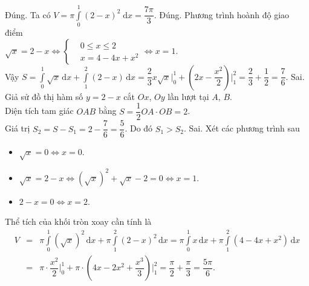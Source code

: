 \begin{ex}
{\begin{itemchoice}
	\itemch Đúng. Ta có $V=\pi\displaystyle\int\limits_0^1(2-x)^2\mathrm{\;d}x=\dfrac{7\pi}{3}$.
	\itemch Đúng. 	Phương trình hoành độ giao điểm \\$\sqrt{x}=2-x \Leftrightarrow \left\{\begin{aligned}
		&0\leqslant x\leqslant 2 \\
		&x=4-4x+x^2
	\end{aligned}\right. \Leftrightarrow x=1$. \\
	Vậy $S=\displaystyle\int\limits_0^1 \sqrt{x} \mathrm{\,d}x+\displaystyle\int\limits_1^2 (2-x) \mathrm{\,d}x=\dfrac{2}{3}x\sqrt{x}\bigg|_0^1+\left(2x-\dfrac{x^2}{2}\right)\bigg|_1^2=\dfrac{2}{3}+\dfrac{1}{2}=\dfrac{7}{6}$.
	\itemch Sai. Giả sử đồ thị hàm số $y=2-x$ cắt $Ox$, $Oy$ lần lượt tại $A$, $B$.\\
	 Diện tích tam giác $OAB$ bằng $S=\dfrac{1}{2}OA\cdot OB=2$. \\
	Giá trị $S_2=S-S_1=2-\dfrac{7}{6}=\dfrac{5}{6}$. Do đó $S_1>S_2$.
	\itemch Sai. Xét các phương trình sau
	\begin{itemize}
		\item $\sqrt{x} = 0 \Leftrightarrow x=0$.
		\item $\sqrt{x} = 2-x \Leftrightarrow \left(\sqrt{x}\right)^2 + \sqrt{x} -2 =0 \Leftrightarrow x=1$.		
		\item $2-x=0 \Leftrightarrow x=2$.
	\end{itemize}
	Thể tích của khối tròn xoay cần tính là 	
	\allowdisplaybreaks
	\begin{eqnarray*}
		V &=& \pi \displaystyle \int\limits_{0}^{1} \left(\sqrt{x}\right)^2 \mathrm{\,d}x + \pi \displaystyle \int\limits_{1}^{2} (2-x)^2 \mathrm{\,d}x = \pi \displaystyle \int\limits_{0}^{1} x \mathrm{\,d}x + \pi \displaystyle \int\limits_{1}^{2} \left(4-4x+x^2\right) \mathrm{\,d}x\\		
		&=& \pi	\cdot \dfrac{x^2}{2} \bigg|_{0}^{1}	 + \pi	\cdot \left(4x - 2x^2 + \dfrac{x^3}{3}\right) \bigg|_{1}^{2} = \dfrac{\pi}{2} + \dfrac{\pi}{3} = \dfrac{5\pi}{6}.
	\end{eqnarray*}
\end{itemchoice}
}
\end{ex}

